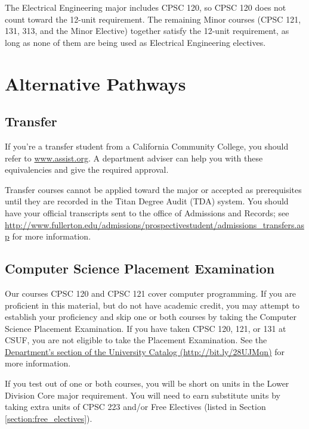 \documentclass{book}
\newcommand{\CampusName}{CSUF}
\begin{document}
The Electrical Engineering major includes CPSC 120, so CPSC 120 does not count toward the 12-unit requirement. The remaining Minor courses (CPSC 121, 131, 313, and the Minor Elective) together satisfy the 12-unit requirement, as long as none of them are being used as Electrical Engineering electives.

\chapter{Alternative Pathways}

\section{Transfer}

If you're a transfer student from a California Community College, you should refer to \url{www.assist.org}. A department adviser can help you with these equivalencies and give the required approval.

Transfer courses cannot be applied toward the major or accepted as prerequisites until they are recorded in the Titan Degree Audit (TDA) system. You should have your official transcripts sent to the office of Admissions and Records; see \url{http://www.fullerton.edu/admissions/prospectivestudent/admissions_transfers.asp} for more information.

\section{Computer Science Placement Examination}
\label{section:placement}
Our courses CPSC 120 and CPSC 121 cover computer programming. If you are
proficient in this material, but do not have academic credit, you may attempt
to establish your proficiency and skip one or both courses by taking the
Computer Science Placement Examination. If you have taken CPSC 120, 121, or 131
at \CampusName, you are not eligible to take the Placement Examination. See the
\href{http://catalog.fullerton.edu/preview_program.php?catoid=2&poid=537&returnto=137}{Department's
section of the University Catalog (\url{http://bit.ly/28UJMqn})} for more information.

If you test out of one or both courses, you will be short on units in the Lower Division Core major requirement. You will need to earn substitute units by taking extra units of CPSC 223 and/or Free Electives (listed in Section \ref{section:free_electives}).
\end{document}
